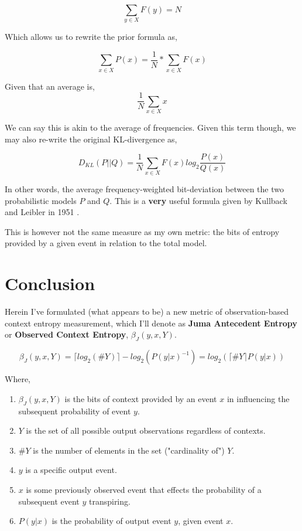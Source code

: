 \documentclass{article}
\begin{document}
\begin{equation}
\sum_{y\in X} F(y) = N
\end{equation}

Which allows us to rewrite the prior formula as,

\begin{equation}
\sum_{x\in X}P(x) = \frac{1}{N} * \sum _{x \in X} F(x)
\end{equation}

Given that an average is,
\begin{equation}
\frac{1}{N} \sum_{x \in X} x
\end{equation}

We can say this is akin to the average of frequencies. Given this term though, we may also re-write the original KL-divergence as,

\begin{equation}
D_{KL}(P||Q) = \frac{1}{N} \sum_{x \in X}F(x)  log_{2}\frac{P(x)}{Q(x)}
\end{equation}

In other words, the average frequency-weighted bit-deviation between the two probabilistic models $P$ and $Q$. This is a \textbf{very} useful formula given by Kullback and Leibler in 1951 \cite{kullback1951}.

This is however not the same measure as my own metric: the bits of entropy provided by a given event in relation to the total model.

\section{Conclusion}
Herein I've formulated (what appears to be) a new metric of observation-based context entropy measurement, which I'll denote as \textbf{Juma Antecedent Entropy} or \textbf{Observed Context Entropy}, $\beta_{J}(y,x,Y)$.\

\begin{equation}
    \beta_{J}(y,x,Y) = {\lceil log_{2}(\#Y) \rceil} - log_{2}(P(y|x)^{-1}) = log_{2}({\lceil \#Y \rceil}P(y|x))
\end{equation}

Where,
\begin{enumerate}
    \item $\beta_{J}(y,x,Y)$ is the bits of context provided by an event $x$ in influencing the subsequent probability of event $y$.
    \item $Y$ is the set of all possible output observations regardless of contexts.
    \item $\#Y$ is the number of elements in the set ("cardinality of") $Y$.
    \item $y$ is a specific output event.
    \item $x$ is some previously observed event that effects the probability of a subsequent event $y$ transpiring.
    \item $P(y|x)$ is the probability of output event $y$, given event $x$.
\end{enumerate}
\end{document}
